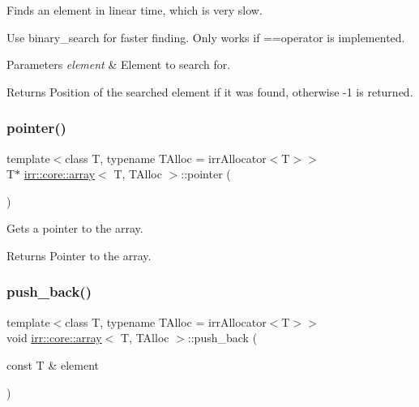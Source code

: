 Finds an element in linear time, which is very slow. 

Use binary\+\_\+search for faster finding. Only works if ==operator is implemented. 
\begin{DoxyParams}{Parameters}
{\em element} & Element to search for. \\
\hline
\end{DoxyParams}
\begin{DoxyReturn}{Returns}
Position of the searched element if it was found, otherwise -\/1 is returned. 
\end{DoxyReturn}
\mbox{\label{classirr_1_1core_1_1array_a7b29797486e1c2ab3e7821082dab998c}} 
\subsubsection{\texorpdfstring{pointer()}{pointer()}}
{\footnotesize\ttfamily template$<$class T, typename T\+Alloc = irr\+Allocator$<$\+T$>$$>$ \\
T$\ast$ \hyperlink{classirr_1_1core_1_1array}{irr\+::core\+::array}$<$ T, T\+Alloc $>$\+::pointer (\begin{DoxyParamCaption}{ }\end{DoxyParamCaption})\hspace{0.3cm}{\ttfamily [inline]}}



Gets a pointer to the array. 

\begin{DoxyReturn}{Returns}
Pointer to the array. 
\end{DoxyReturn}
\mbox{\label{classirr_1_1core_1_1array_ad2c9dff8592b95c25c59f5383fc633fe}} 
\subsubsection{\texorpdfstring{push\+\_\+back()}{push\_back()}}
{\footnotesize\ttfamily template$<$class T, typename T\+Alloc = irr\+Allocator$<$\+T$>$$>$ \\
void \hyperlink{classirr_1_1core_1_1array}{irr\+::core\+::array}$<$ T, T\+Alloc $>$\+::push\+\_\+back (\begin{DoxyParamCaption}\item[{const T \&}]{element }\end{DoxyParamCaption})\hspace{0.3cm}{\ttfamily [inline]}}



